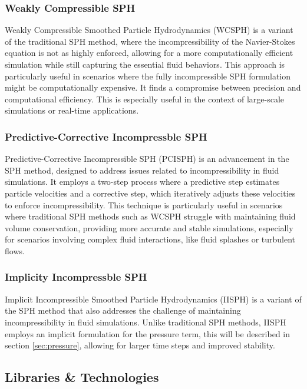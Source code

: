 \documentclass[intern]{cgMA}
\begin{document}
    \subsubsection*{Weakly Compressible SPH}
    Weakly Compressible Smoothed Particle Hydrodynamics (WCSPH) is a variant of the traditional SPH method, where the incompressibility of the Navier-Stokes equation is not as highly enforced, allowing for a more computationally efficient simulation while still capturing the essential fluid behaviors. This approach is particularly useful in scenarios where the fully incompressible SPH formulation might be computationally expensive. It finds a compromise between precision and computational efficiency. This is especially useful in the context of large-scale simulations or real-time applications.\cite{wcsph}

    \subsubsection*{Predictive-Corrective Incompressble SPH} 
    Predictive-Corrective Incompressible SPH (PCISPH) is an advancement in the SPH method, designed to address issues related to incompressibility in fluid simulations. It employs a two-step process where a predictive step estimates particle velocities and a corrective step, which iteratively adjusts these velocities to enforce incompressibility. This technique is particularly useful in scenarios where traditional SPH methods such as WCSPH struggle with maintaining fluid volume conservation, providing more accurate and stable simulations, especially for scenarios involving complex fluid interactions, like fluid splashes or turbulent flows. \cite{10.1145/1576246.1531346}

    \subsubsection*{Implicity Incompressble SPH} \label{sec:iisph}
    Implicit Incompressible Smoothed Particle Hydrodynamics (IISPH) is a variant of the SPH method that also addresses the challenge of maintaining incompressibility in fluid simulations. Unlike traditional SPH methods, IISPH employs an implicit formulation for the pressure term, this will be described in section \ref{sec:pressure}, allowing for larger time steps and improved stability.\cite{6570475} 

    \pagebreak
    \subsection{Libraries \& Technologies}
\end{document}
